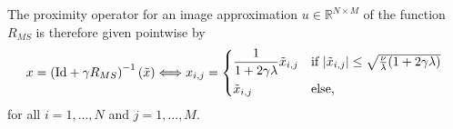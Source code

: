 \documentclass{scrreprt}
\begin{document}
            The proximity operator for an image approximation $u \in \mathbb{R}^{N \times M}$ of the function $R_{MS}$ is therefore given pointwise by
                \begin{equation}
                    x = \left( \textnormal{Id} + \gamma R_{MS} \right)^{-1}(\tilde{x}) \Longleftrightarrow x_{i,j} =
                    \begin{dcases*}
                        \frac{1}{1 + 2\gamma\lambda}\tilde{x}_{i,j} & \textnormal{if $|\tilde{x}_{i,j}| \le \sqrt{\frac{\nu}{\lambda}(1 + 2\gamma\lambda)}$} \\
                        \tilde{x}_{i,j} & \textnormal{else,}
                    \end{dcases*}
                    \label{eq:proximity_operator_R}
                \end{equation}
            for all $i = 1, ..., N$ and $j = 1, ..., M$.
\end{document}
